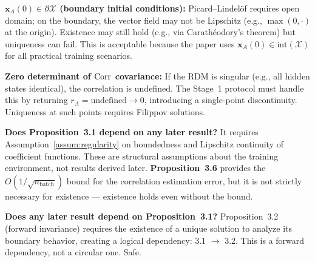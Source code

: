 \begin{boundary-case}
\textbf{$\mathbf{x}_A(0) \in \partial\mathcal{X}$ (boundary initial
conditions):} Picard--Lindelöf requires open domain; on the boundary,
the vector field may not be Lipschitz (e.g., $\max(0,\cdot)$ at the
origin). Existence may still hold (e.g., via Carathéodory's theorem)
but uniqueness can fail. This is acceptable because the paper uses
$\mathbf{x}_A(0) \in \text{int}(\mathcal{X})$ for all practical
training scenarios.

\textbf{Zero determinant of $\operatorname{Corr}$ covariance:} If the RDM is
singular (e.g., all hidden states identical), the correlation is
undefined. The Stage~1 protocol must handle this by returning
$r_A = \text{undefined} \to 0$, introducing a single-point
discontinuity. Uniqueness at such points requires Filippov
solutions.
\end{boundary-case}

\begin{circularity-check}
\textbf{Does Proposition~3.1 depend on any later result?} It requires
Assumption~\ref{assum:regularity} on boundedness and Lipschitz
continuity of coefficient functions. These are structural assumptions
about the training environment, not results derived later. 
\textbf{Proposition~3.6} provides the $O(1/\sqrt{n_{\text{batch}}})$
bound for the correlation estimation error, but it is not strictly
necessary for existence --- existence holds even without the bound.

\textbf{Does any later result depend on Proposition~3.1?}
Proposition~3.2 (forward invariance) requires the existence of a
unique solution to analyze its boundary behavior, creating a logical
dependency: 3.1 $\to$ 3.2. This is a forward dependency, not a
circular one. Safe.
\end{circularity-check}
